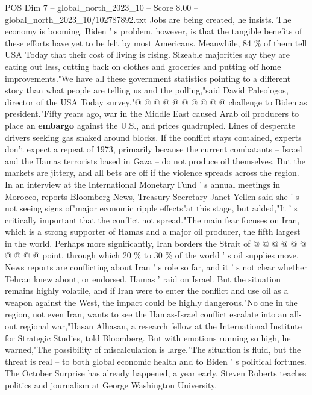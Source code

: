 \begin{textsample}{POS Dim 7 – global\_north\_2023\_10 – Score 8.00 – global\_north\_2023\_10/102787892.txt}
Jobs are being created, he insists.
The economy is booming.
Biden ' s problem, however, is that the tangible benefits of these efforts have yet to be felt by most Americans.
Meanwhile, 84 \% of them tell USA Today that their cost of living is rising.
Sizeable majorities say they are eating out less, cutting back on clothes and groceries and putting off home improvements."We have all these government statistics pointing to a different story than what people are telling us and the polling,"said David Paleologos, director of the USA Today survey."@ @ @ @ @ @ @ @ @ @ challenge to Biden as president."Fifty years ago, war in the Middle East caused Arab oil producers to place an \textbf{embargo} against the U.S., and prices quadrupled.
Lines of desperate drivers seeking gas snaked around blocks.
If the conflict stays contained, experts don't expect a repeat of 1973, primarily because the current combatants -- Israel and the Hamas terrorists based in Gaza -- do not produce oil themselves.
But the markets are jittery, and all bets are off if the violence spreads across the region.
In an interview at the International Monetary Fund ' s annual meetings in Morocco, reports Bloomberg News, Treasury Secretary Janet Yellen said she ' s not seeing signs of"major economic ripple effects"at this stage, but added,"It ' s critically important that the conflict not spread."The main fear focuses on Iran, which is a strong supporter of Hamas and a major oil producer, the fifth largest in the world.
Perhaps more significantly, Iran borders the Strait of @ @ @ @ @ @ @ @ @ @ point, through which 20 \% to 30 \% of the world ' s oil supplies move.
News reports are conflicting about Iran ' s role so far, and it ' s not clear whether Tehran knew about, or endorsed, Hamas ' raid on Israel.
But the situation remains highly volatile, and if Iran were to enter the conflict and use oil as a weapon against the West, the impact could be highly dangerous."No one in the region, not even Iran, wants to see the Hamas-Israel conflict escalate into an all-out regional war,"Hasan Alhasan, a research fellow at the International Institute for Strategic Studies, told Bloomberg.
But with emotions running so high, he warned,"The possibility of miscalculation is large."The situation is fluid, but the threat is real -- to both global economic health and to Biden ' s political fortunes.
The October Surprise has already happened, a year early.
Steven Roberts teaches politics and journalism at George Washington University.

\end{textsample}
